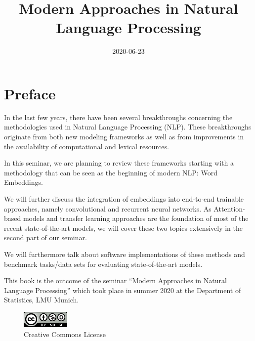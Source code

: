 \documentclass[]{krantz}
\title{Modern Approaches in Natural Language Processing}
\author{}
\date{\vspace{-2.5em}2020-06-23}
\begin{document}
\maketitle


\thispagestyle{empty}

\begin{center}
\end{center}

\setlength{\abovedisplayskip}{-5pt}
\setlength{\abovedisplayshortskip}{-5pt}

{
\hypersetup{linkcolor=}
\setcounter{tocdepth}{0}
\tableofcontents
}
\hypertarget{preface}{%
\chapter*{Preface}\label{preface}}


In the last few years, there have been several breakthroughs concerning the methodologies used in Natural Language Processing (NLP). These breakthroughs originate from both new modeling frameworks as well as from improvements in the availability of computational and lexical resources.

In this seminar, we are planning to review these frameworks starting with a methodology that can be seen as the beginning of modern NLP: Word Embeddings.

We will further discuss the integration of embeddings into end-to-end trainable approaches, namely convolutional and recurrent neural networks. As Attention-based models and transfer learning approaches are the foundation of most of the recent state-of-the-art models, we will cover these two topics extensively in the second part of our seminar.

We will furthermore talk about software implementations of these methods and benchmark tasks/data sets for evaluating state-of-the-art models.

This book is the outcome of the seminar ``Modern Approaches in Natural Language Processing'' which took place in summer 2020 at the Department of Statistics, LMU Munich.

\begin{figure}
\centering
\includegraphics{figures/by-nc-sa.png}
\caption{Creative Commons License}
\end{figure}
\end{document}

